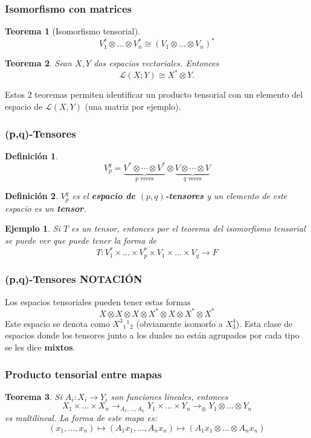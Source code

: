 \documentclass{beamer}
\newtheorem{teo}{Teorema}
\newtheorem{defi}{Definición}
\newtheorem{ejemplo}{Ejemplo}
\begin{document}
\begin{frame}
    \frametitle{Isomorfismo con matrices}
    \begin{teo}[Isomorfismo tensorial]
        $$
        V_1^* \otimes ... \otimes V_n^* \cong (V_1 \otimes ... \otimes V_n)^*
        $$
    \end{teo}
    \pause
	\begin{teo}
		Sean $X, Y$ dos espacios vectoriales. Entonces
		$$
		\mathcal{L} (X;Y) \cong X^* \otimes Y.
		$$
	\end{teo}
    \pause
    Estos 2 teoremas permiten identificar un producto tensorial con un elemento 
    del espacio de $\mathcal{L}(X,Y)$ (una matriz por ejemplo).
\end{frame}
\begin{frame}
    \frametitle{(p,q)-Tensores}
    \begin{defi}
        \[
        V_p^q = \underbrace{
        V^* \otimes \cdots \otimes V^*
        }_{p\text{ veces}}
        \otimes
        \underbrace{
        V \otimes \cdots \otimes V
        }_{q\text{ veces}}
        \]
    \end{defi}
    \pause
    \begin{defi}
        $V_p^q$ es el \textbf{espacio de $(p,q)$-tensores}
        y un elemento de este espacio es un \textbf{tensor}.
    \end{defi}
\end{frame}
\begin{frame}
    \begin{ejemplo}
        Si $T$ es un tensor, entonces por el teorema del isomorfismo tensorial
        se puede ver que puede tener la forma de
        $$
        T : V_1^* \times ... \times V_p^* \times V_1 \times ... \times V_q \to F
        $$
    \end{ejemplo}
\end{frame}
\begin{frame}
    \frametitle{(p,q)-Tensores NOTACIÓN}
	Los espacios tensoriales pueden tener estas formas
	$$
	X \otimes X\otimes X\otimes X^* \otimes X\otimes X^* \otimes X^*
	$$
	\pause
	Este espacio se denota como $X^3{_1}^1{_2}$ (obviamente isomorfo a $X_3^4$).
    \pause
    Esta clase de espacios donde los tensores junto a los duales no están agrupados
    por cada tipo se les dice \textbf{mixtos}.
\end{frame}
\begin{frame}
	\frametitle{Producto tensorial entre mapas}
	\begin{teo}
		Si $A_i : X_i \to Y_i$ son funciones lineales, entonces
		$$
		X_1 \times ... \times X_n \to_{A_1,...,A_n} Y_1 \times ... \times Y_n \to_{\otimes} Y_1 \otimes ... \otimes Y_n
		$$
		es multilineal. La forma de este mapa es:
		$$
		(x_1,...,x_n) \mapsto (A_1 x_1 ,... , A_n x_n) \mapsto (A_1 x_1 \otimes ... \otimes A_n x_n)
		$$
	\end{teo}
\end{frame}
\end{document}
